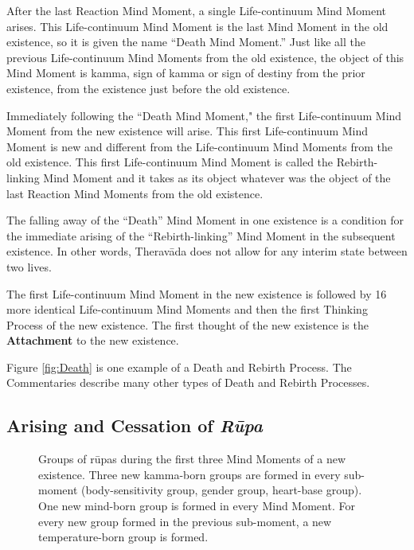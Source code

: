 After the last Reaction Mind Moment, a single Life-continuum Mind Moment arises. This Life-continuum Mind Moment is the last Mind Moment in the old existence, so it is given the name “Death Mind Moment.” Just like all the previous Life-continuum Mind Moments from the old existence, the object of this Mind Moment is kamma, sign of kamma or sign of destiny from the prior existence, from the existence just before the old existence.

Immediately following the ``Death Mind Moment," the first Life-continuum Mind Moment from the new existence will arise. This first Life-continuum Mind Moment is new and different from the Life-continuum Mind Moments from the old existence. This first Life-continuum Mind Moment is called the Rebirth-linking Mind Moment and it takes as its object whatever was the object of the last Reaction Mind Moments from the old existence.

The falling away of the “Death” Mind Moment in one existence is a condition for the immediate arising of the “Rebirth-linking” Mind Moment in the subsequent existence. In other words, Theravāda does not allow for any interim state between two lives.

The first Life-continuum Mind Moment in the new existence is followed by 16 more identical Life-continuum Mind Moments and then the first Thinking Process of the new existence. The first thought of the new existence is the \textbf{Attachment} to the new existence.

Figure \ref{fig:Death} is one example of a Death and Rebirth Process. The Commentaries describe many other types of Death and Rebirth Processes.

\subsection*{Arising and Cessation of \textit{Rūpa}}

\begin{figure}[H]
\centering

\caption{Groups of rūpas during the first three Mind Moments of a new existence. Three new kamma-born groups are formed in every sub-moment (body-sensitivity group, gender group, heart-base group). One new mind-born group is formed in every Mind Moment. For every new group formed in the previous sub-moment, a new temperature-born group is formed.}
\label{fig:NewRupa}
\end{figure}

\pagebreak

